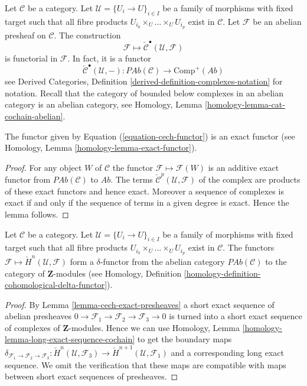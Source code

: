 \medskip\noindent
Let $\mathcal{C}$ be a category. Let $\mathcal{U} = \{U_i \to U\}_{i \in I}$
be a family of morphisms with fixed target such that all fibre products
$U_{i_0} \times_U \ldots \times_U U_{i_p}$ exist in $\mathcal{C}$.
Let $\mathcal{F}$ be an abelian presheaf on $\mathcal{C}$.
The construction
$$
\mathcal{F} \longmapsto \check{\mathcal{C}}^\bullet(\mathcal{U}, \mathcal{F})
$$
is functorial in $\mathcal{F}$. In fact, it is a functor
\begin{equation}
\label{equation-cech-functor}
\check{\mathcal{C}}^\bullet(\mathcal{U}, -) :
\textit{PAb}(\mathcal{C})
\longrightarrow
\text{Comp}^{+}(\textit{Ab})
\end{equation}
see
Derived Categories, Definition \ref{derived-definition-complexes-notation}
for notation. Recall that the category of bounded below complexes
in an abelian category is an abelian category, see
Homology, Lemma \ref{homology-lemma-cat-cochain-abelian}.

\begin{lemma}
\label{lemma-cech-exact-presheaves}
The functor given by Equation (\ref{equation-cech-functor})
is an exact functor (see Homology, Lemma \ref{homology-lemma-exact-functor}).
\end{lemma}

\begin{proof}
For any object $W$ of $\mathcal{C}$ the functor
$\mathcal{F} \mapsto \mathcal{F}(W)$ is an additive exact functor
from $\textit{PAb}(\mathcal{C})$ to $\textit{Ab}$.
The terms $\check{\mathcal{C}}^p(\mathcal{U}, \mathcal{F})$
of the complex are products of these exact functors and hence exact.
Moreover a sequence of complexes is exact if and only if the sequence
of terms in a given degree is exact. Hence the lemma follows.
\end{proof}

\begin{lemma}
\label{lemma-cech-cohomology-delta-functor-presheaves}
Let $\mathcal{C}$ be a category.
Let $\mathcal{U} = \{U_i \to U\}_{i \in I}$ be a family of morphisms
with fixed target such that all fibre products
$U_{i_0} \times_U \ldots \times_U U_{i_p}$ exist in $\mathcal{C}$.
The functors $\mathcal{F} \mapsto \check{H}^n(\mathcal{U}, \mathcal{F})$
form a $\delta$-functor from the abelian category $\textit{PAb}(\mathcal{C})$
to the category of $\mathbf{Z}$-modules (see
Homology, Definition \ref{homology-definition-cohomological-delta-functor}).
\end{lemma}

\begin{proof}
By
Lemma \ref{lemma-cech-exact-presheaves}
a short exact sequence of abelian presheaves
$0 \to \mathcal{F}_1 \to \mathcal{F}_2 \to \mathcal{F}_3 \to 0$
is turned into a short exact sequence of complexes of
$\mathbf{Z}$-modules. Hence we can use
Homology, Lemma \ref{homology-lemma-long-exact-sequence-cochain}
to get the boundary maps
$\delta_{\mathcal{F}_1 \to \mathcal{F}_2 \to \mathcal{F}_3} :
\check{H}^n(\mathcal{U}, \mathcal{F}_3) \to
\check{H}^{n + 1}(\mathcal{U}, \mathcal{F}_1)$
and a corresponding long exact sequence. We omit the verification
that these maps are compatible with maps between short exact
sequences of presheaves.
\end{proof}

